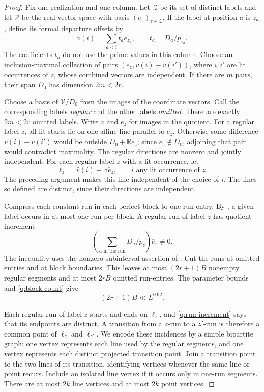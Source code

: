 \begin{proof}
Fix one realization and one column.  Let $\mathcal Z$ be its set of
distinct labels and let $\mathcal V$ be the real vector space with
basis $(e_z)_{z\in\mathcal Z}$.  If the label at position $a$ is
$z_a$, define its formal departure offsets by
\[
 v(i)=\sum_{a<i}t_a e_{z_a},\qquad
 t_a=D_a/p_{z_a}.
\]
The coefficients $t_a$ do not use the prime values in this column.
Choose an inclusion-maximal collection of pairs
$(e_z,v(i)-v(i'))$, where $i,i'$ are lit occurrences of $z$, whose
combined vectors are independent.  If there are $m$ pairs, their
span $D_0$ has dimension $2m<2r$.

Choose a basis of $\mathcal V/D_0$ from the images of the coordinate
vectors.  Call the corresponding labels \emph{regular} and the
other labels \emph{omitted}.  There are exactly $2m<2r$ omitted
labels.  Write $\bar v$ and $\bar e_z$ for images in the quotient.
For a regular label $z$, all lit starts lie on one affine line
parallel to $\bar e_z$.  Otherwise some difference
$v(i)-v(i')$ would be outside $D_0+\mathbb R e_z$; since
$e_z\notin D_0$, adjoining that pair would contradict maximality.
The regular directions are nonzero and jointly independent.  For each
regular label $z$ with a lit occurrence, let
\[
 \ell_z=\bar v(i)+\mathbb R\bar e_z,
 \qquad i\text{ any lit occurrence of }z.
\]
The preceding argument makes this line independent of the choice of
$i$.  The lines so defined are distinct, since their directions are
independent.

Compress each constant run in each perfect block to one run-entry.
By , a given label occurs in at most one run
per block.  A regular run of label $z$ has quotient increment
\begin{equation}\label{q:run-increment}
 \left(\sum_{a\text{ in the run}}D_a/p_z\right)\bar e_z\ne0.
\end{equation}
The inequality uses the nonzero-subinterval assertion of
.  Cut the runs at omitted entries and at
block boundaries.  This leaves at most $(2r+1)B$ nonempty regular
segments and at most $2rB$ omitted run-entries.  The parameter bounds
and \eqref{q:block-count} give
\begin{equation}\label{q:segment-count}
 (2r+1)B\ll L^{0.92}.
\end{equation}

Each regular run of label $z$ starts and ends on $\ell_z$, and
\eqref{q:run-increment} says that its endpoints are distinct.  A
transition from a $z$-run to a $z'$-run is therefore a common point of
$\ell_z$ and $\ell_{z'}$.  We encode these incidences by a simple
bipartite graph: one vertex represents each line used by the regular
segments, and one vertex represents each distinct projected transition
point.  Join a transition point to the two lines of its transition,
identifying vertices whenever the same line or point recurs.  Include
an isolated line vertex if it occurs only in one-run segments.
There are at most $2k$ line vertices and at most $2k$ point vertices.


\end{proof}
